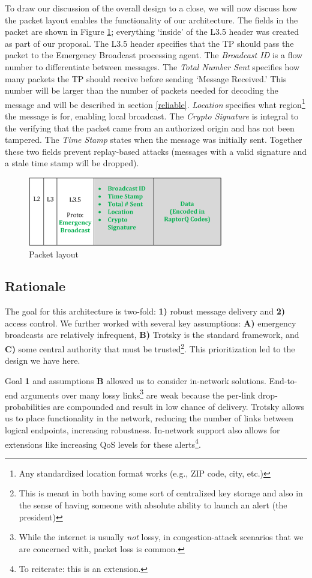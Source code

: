To draw our discussion of the overall design to a close, we will now discuss how the packet layout enables the functionality of our architecture. The fields in the packet are shown in Figure \ref{fig:pckt}; everything `inside' of the L3.5 header was created as part of our proposal. The L3.5 header specifies that the TP should pass the packet to the Emergency Broadcast processing agent. The\textit{ Broadcast ID} is a flow number to differentiate between messages. The \textit{Total Number Sent} specifies how many packets the TP should receive before sending `Message Received.' This number will be larger than the number of packets needed for decoding the message and will be described in section \ref{reliable}. \textit{Location} specifies what region\footnote{Any standardized location format works (e.g., ZIP code, city, etc.)} the message is for, enabling local broadcast. The \textit{Crypto Signature} is integral to the verifying that the packet came from an authorized origin and has not been tampered. The \textit{Time Stamp} states when the message was initially sent. Together these two fields prevent replay-based attacks (messages with a valid signature and a stale time stamp will be dropped).
\begin{figure}[tp]
\centering
\includegraphics[width=8.5cm]{figures/packet_header_final.png}
\caption{Packet layout}
\label{fig:pckt}
\end{figure}

\subsection{Rationale}
The goal for this architecture is two-fold: \textbf{1)} robust message delivery and \textbf{2)} access control. We further worked with several key assumptions:  \textbf{A)} emergency broadcasts are relatively infrequent, \textbf{B)} Trotsky is the standard framework, and \textbf{C)} some central authority that must be trusted\footnote{This is meant in both having some sort of centralized key storage and also in the sense of having someone with absolute ability to launch an alert (the president)}. This prioritization led to the design we have here.  

Goal \textbf{1} and assumptions \textbf{B} allowed us to consider in-network solutions. End-to-end arguments over many lossy links\footnote{While the internet is usually \textit{not} lossy, in congestion-attack scenarios that we are concerned with, packet loss is common.} are weak because the per-link drop-probabilities are compounded and result in low chance of delivery. Trotsky allows us to place functionality in the network, reducing the number of links between logical endpoints, increasing robustness. In-network support also allows for extensions like increasing QoS levels for these alerts\footnote{To reiterate: this is an extension.}. 


